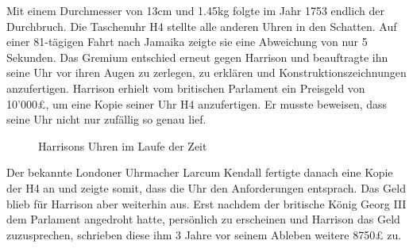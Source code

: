 \begin{refsection}
Mit einem Durchmesser von 13cm und 1.45kg folgte im Jahr 1753 endlich der Durchbruch.
Die Taschenuhr H4 stellte alle anderen Uhren in den Schatten. Auf einer 81-tägigen Fahrt nach Jamaika zeigte sie eine Abweichung von nur 5 Sekunden.
Das Gremium entschied erneut gegen Harrison und beauftragte ihn seine Uhr vor ihren Augen zu zerlegen, zu erklären und Konstruktionszeichnungen anzufertigen.
Harrison erhielt vom britischen Parlament ein Preisgeld von 10’000£, um eine Kopie seiner Uhr H4 anzufertigen. Er musste beweisen, dass seine Uhr nicht nur zufällig so genau lief.
\begin{figure}[!htb]
\centering
\quad \quad
\centering
\quad \quad
\centering
\caption{Harrisons Uhren im Laufe der Zeit} 
\end{figure}

Der bekannte Londoner Uhrmacher Larcum Kendall fertigte danach eine Kopie der H4 an und zeigte somit, dass die Uhr den Anforderungen entsprach.
Das Geld blieb für Harrison aber weiterhin aus. Erst nachdem der britische König Georg III dem Parlament angedroht hatte, persönlich zu erscheinen und Harrison das Geld zuzusprechen, schrieben diese ihm 3 Jahre vor seinem Ableben weitere 8750£ zu.


\end{refsection}
